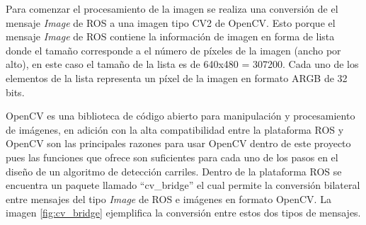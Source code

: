 Para comenzar el procesamiento de la imagen se realiza una conversión de el mensaje \textit{Image} de ROS a una imagen tipo CV2 de OpenCV. Esto porque el mensaje \textit{Image} de ROS contiene la información de imagen en forma de lista donde el tamaño corresponde a el número de píxeles de la imagen (ancho por alto), en este caso el tamaño de la lista es de 640x480 = 307200. Cada uno de los elementos de la lista representa un píxel de la imagen en formato ARGB de 32 bits.

OpenCV es una biblioteca de código abierto para manipulación y procesamiento de imágenes, en adición con la alta compatibilidad entre la plataforma ROS y OpenCV son las principales razones para usar OpenCV dentro de este proyecto pues las funciones que ofrece son suficientes para cada uno de los pasos en el diseño de un algoritmo de detección carriles. Dentro de la plataforma ROS se encuentra un paquete llamado ``cv\_bridge'' el cual permite la conversión bilateral entre mensajes del tipo \textit{Image} de ROS e imágenes en formato OpenCV. La imagen \ref{fig:cv_bridge} ejemplifica la conversión entre estos dos tipos de mensajes.
